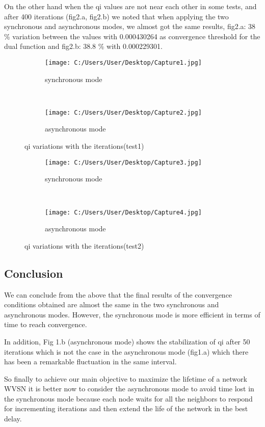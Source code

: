 \documentclass[12pt,a4]{article}
\begin{document}
On the other hand when the qi values are not near each other in some tests, and after 400 iterations (fig2.a, fig2.b) we noted that when applying the two synchronous and asynchronous modes, we almost got the same results, fig2.a: 38 \% variation between the  values with 0.000430264 as convergence threshold for the dual function and fig2.b: 38.8 \% with 0.000229301.


\begin{figure}[ht]
\centering
	\begin{center}
	     \begin{subfigure}[normla]{0.4\textwidth}
		\texttt{[image: C:/Users/User/Desktop/Capture1.jpg]}
		\caption{synchronous mode}
	    \end{subfigure}
\hspace{0.8cm}
	~
	    \begin{subfigure}[normla]{0.4\textwidth}
		\texttt{[image: C:/Users/User/Desktop/Capture2.jpg]}
		\caption{asynchronous mode}
	    \end{subfigure}
	\end{center}
\caption{qi variations with the iterations(test1) }
\end{figure}

\begin{figure}[ht]
\centering
	\begin{center}
	     \begin{subfigure}[normla]{0.4\textwidth}
		\texttt{[image: C:/Users/User/Desktop/Capture3.jpg]}
		\caption{synchronous mode}
	    \end{subfigure}
\hspace{0.8cm}
	~
	    \begin{subfigure}[normla]{0.4\textwidth}
		\texttt{[image: C:/Users/User/Desktop/Capture4.jpg]}
		\caption{asynchronous mode}
	    \end{subfigure}
	\end{center}
\caption{qi variations with the iterations(test2) }
\end{figure}

\subsection{Conclusion}

\hspace{0.6cm}We can conclude from the above that the final results of the convergence conditions obtained are almost the same in the two synchronous and asynchronous modes. However, the synchronous mode is more efficient in terms of time to reach convergence.

In addition, Fig 1.b (asynchronous mode) shows the stabilization of qi after 50 iterations which is not the case in the asynchronous mode (fig1.a) which there has been a remarkable fluctuation in the same interval. 

So finally to achieve our main objective to maximize the lifetime of a network WVSN it is better now to consider the asynchronous mode to avoid time lost in the synchronous mode because each node waits for all the neighbors to respond for incrementing iterations and then extend the life of the network in the best delay.
\end{document}

